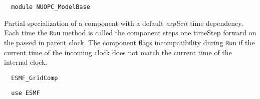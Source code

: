  
\setlength{\parskip}{0pt}
\setlength{\parindent}{0pt}
\setlength{\baselineskip}{11pt}
 
\def\bv{\begin{verbatim}}
\def\ev{\end{verbatim}}
\def\be{\begin{equation}}
\def\ee{\end{equation}}
\def\bea{\begin{eqnarray}}
\def\eea{\end{eqnarray}}
\def\bi{\begin{itemize}}
\def\ei{\end{itemize}}
\def\bn{\begin{enumerate}}
\def\en{\end{enumerate}}
\def\bd{\begin{description}}
\def\ed{\end{description}}
\def\({\left (}
\def\){\right )}
\def\[{\left [}
\def\]{\right ]}
\def\<{\left  \langle}
\def\>{\right \rangle}
\def\cI{{\cal I}}
\def\diag{\mathop{\rm diag}}
\def\tr{\mathop{\rm tr}}


\begin{verbatim}  module NUOPC_ModelBase
\end{verbatim}

Partial specialization of a component with a default {\em explicit} time dependency. Each time the {\tt Run} method is called the component steps one timeStep forward on the passed in parent
clock. The component flags incompatibility during {\tt Run} if the current time of the incoming
clock does not match the current time of the internal clock.

\begin{verbatim}  ESMF_GridComp
\end{verbatim}

\begin{verbatim}  use ESMF
\end{verbatim}

